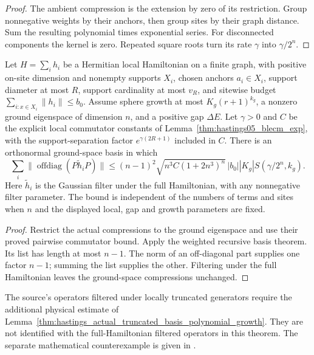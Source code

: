 \begin{proof}\leanok
    The ambient compression is the extension by zero of its restriction.
    Group nonnegative weights by their anchors, then group sites by their
    graph distance. Sum the resulting polynomial times exponential series.
    For disconnected components the kernel is zero. Repeated square roots
    turn its rate $\gamma$ into $\gamma/2^n$.
\end{proof}

\begin{lemma}
    \label{thm:hastings_full_hamiltonian_uniform_basis}
    \leanok

    Let $H=\sum_i h_i$ be a Hermitian local Hamiltonian on a finite graph,
    with positive on-site dimension and nonempty supports $X_i$, chosen anchors $a_i\in X_i$, support
    diameter at most $R$, support cardinality at most $v_R$, and sitewise
    budget $\sum_{i:x\in X_i}\|h_i\|\le b_0$.
    Assume sphere growth at most $K_g(r+1)^{k_g}$, a nonzero ground
    eigenspace of dimension $n$, and a positive gap $\Delta E$.
    Let $\gamma>0$ and $C$ be the explicit local commutator constants of
    Lemma~\ref{thm:hastings05_blecm_exp}, with the support-separation
    factor $e^{\gamma(2R+1)}$ included in $C$. There is an orthonormal
    ground-space basis in which
    \[
      \sum_i\|\operatorname{offdiag}(P\widetilde h_iP)\|
      \le (n-1)^2\sqrt{n^3C(1+2n^3)^n}\,
         |b_0||K_g|S(\gamma/2^n,k_g).
    \]
    Here $\widetilde h_i$ is the Gaussian filter under the full
    Hamiltonian, with any nonnegative filter parameter. The bound is
    independent of the numbers of terms and sites when $n$ and the
    displayed local, gap and growth parameters are fixed.
\end{lemma}
\begin{proof}\leanok
    Restrict the actual compressions to the ground eigenspace and use
    their proved pairwise commutator bound. Apply the weighted recursive
    basis theorem. Its list has length at most
    $n-1$. The norm of an off-diagonal part supplies one factor $n-1$;
    summing the list supplies the other. Filtering under the full
    Hamiltonian leaves the ground-space compressions unchanged.
\end{proof}

The source's operators filtered under locally truncated generators require
the additional physical estimate of
Lemma~\ref{thm:hastings_actual_truncated_basis_polynomial_growth}. They are
not identified with the full-Hamiltonian filtered operators in this theorem. The separate mathematical counterexample is given in
\cite{gap:hastings05_tree_basis_counterexample}.
